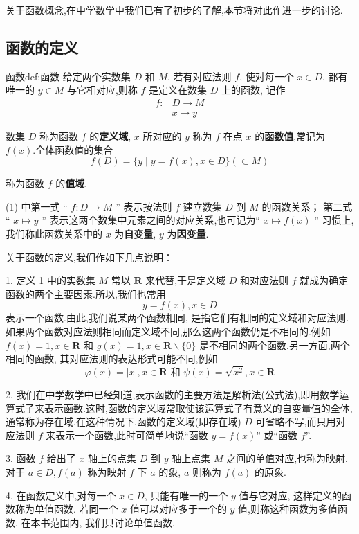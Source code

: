 关于函数概念,在中学数学中我们已有了初步的了解,本节将对此作进一步的讨论.

\subsection{函数的定义}
\begin{definition}{函数}{def:函数}
	给定两个实数集 $D$ 和 $M$, 若有对应法则 $f$, 使对每一个 $x \in D$, 都有唯一的 $y \in M$ 与它相对应,则称 $f$ 是定义在数集 $D$ 上的函数, 记作
	\[
	\begin{aligned}
		f: & D \rightarrow M \\
		& x \mapsto y
	\end{aligned}\tag{1}
	\]

	数集 $D$ 称为函数 $f$ 的\textbf{定义域}, $x$ 所对应的 $y$ 称为 $f$ 在点 $x$ 的\textbf{函数值},常记为 $f(x)$.全体函数值的集合
	\[
	f(D)=\{y \mid y=f(x), x \in D\}(\subset M)
	\]

	称为函数 $f$ 的\textbf{值域}.

	(1) 中第一式 “ $f: D \rightarrow M$ ” 表示按法则 $f$ 建立数集 $D$ 到 $M$ 的函数关系； 第二式 “ $x \mapsto y$ ” 表示这两个数集中元素之间的对应关系,也可记为“ $x \mapsto f(x)$ ” 习惯上,我们称此函数关系中的 $x$ 为\textbf{自变量}, $y$ 为\textbf{因变量}.
\end{definition}


关于函数的定义,我们作如下几点说明：

1. 定义 1 中的实数集 $M$ 常以 $\mathbf{R}$ 来代替,于是定义域 $D$ 和对应法则 $f$ 就成为确定函数的两个主要因素.所以,我们也常用
\[
y=f(x), x \in D
\]
表示一个函数.由此,我们说某两个函数相同, 是指它们有相同的定义域和对应法则.如果两个函数对应法则相同而定义域不同,那么这两个函数仍是不相同的.例如 $f(x)=1, x \in \mathbf{R}$ 和 $g(x)=1, x \in \mathbf{R} \backslash\{0\}$ 是不相同的两个函数.另一方面,两个相同的函数, 其对应法则的表达形式可能不同,例如
\[
\varphi(x)=|x|, x \in \mathbf{R} \text { 和 } \psi(x)=\sqrt{x^{2}}, x \in \mathbf{R}
\]

2. 我们在中学数学中已经知道,表示函数的主要方法是解析法(公式法),即用数学运算式子来表示函数.这时,函数的定义域常取使该运算式子有意义的自变量值的全体,通常称为存在域.在这种情况下,函数的定义域(即存在域) $D$ 可省略不写,而只用对应法则 $f$ 来表示一个函数,此时可简单地说“函数 $y=f(x) $” 或“函数 $f$”.

3. 函数 $f$ 给出了 $x$ 轴上的点集 $D$ 到 $y$ 轴上点集 $M$ 之间的单值对应,也称为映射. 对于 $a \in D, f(a)$ 称为映射 $f$ 下 $a$ 的象, $a$ 则称为 $f(a)$ 的原象.

4. 在函数定义中,对每一个 $x \in D$, 只能有唯一的一个 $y$ 值与它对应, 这样定义的函数称为单值函数. 若同一个 $x$ 值可以对应多于一个的 $y$ 值,则称这种函数为多值函数. 在本书范围内, 我们只讨论单值函数.

